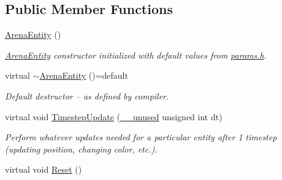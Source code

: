\subsection*{Public Member Functions}
\begin{DoxyCompactItemize}
\item 
\hyperlink{classArenaEntity_a96df749814e89344a6149e4da89b4e44}{Arena\+Entity} ()\hypertarget{classArenaEntity_a96df749814e89344a6149e4da89b4e44}{}\label{classArenaEntity_a96df749814e89344a6149e4da89b4e44}

\begin{DoxyCompactList}\small\item\em \hyperlink{classArenaEntity}{Arena\+Entity} constructor initialized with default values from \hyperlink{params_8h}{params.\+h}. \end{DoxyCompactList}\item 
virtual \hyperlink{classArenaEntity_aa7af53e5d8830d144ccf2ad07d9140da}{$\sim$\+Arena\+Entity} ()=default\hypertarget{classArenaEntity_aa7af53e5d8830d144ccf2ad07d9140da}{}\label{classArenaEntity_aa7af53e5d8830d144ccf2ad07d9140da}

\begin{DoxyCompactList}\small\item\em Default destructor -- as defined by compiler. \end{DoxyCompactList}\item 
virtual void \hyperlink{classArenaEntity_a203613c40a5cecf47606b2a59adcc3bd}{Timestep\+Update} (\hyperlink{common_8h_a2e3484535ee610c8e19e9859563abe48}{\+\_\+\+\_\+unused} unsigned int dt)
\begin{DoxyCompactList}\small\item\em Perform whatever updates needed for a particular entity after 1 timestep (updating position, changing color, etc.). \end{DoxyCompactList}\item 
virtual void \hyperlink{classArenaEntity_abaebe6c02659e22c08579d49829c5676}{Reset} ()\hypertarget{classArenaEntity_abaebe6c02659e22c08579d49829c5676}{}\label{classArenaEntity_abaebe6c02659e22c08579d49829c5676}


\end{DoxyCompactItemize}
